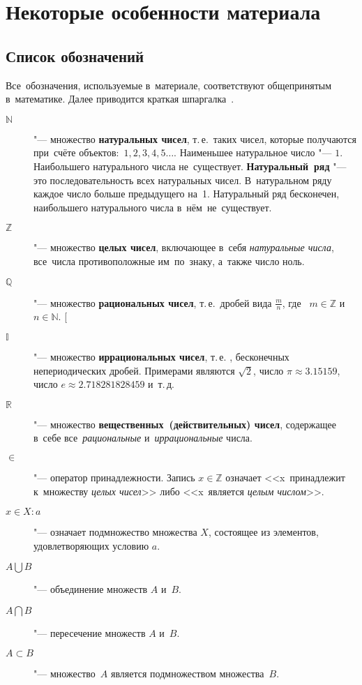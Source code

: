 \documentclass[]{scrartcl}
\begin{document}
\tableofcontents
\section{Некоторые особенности материала}
\subsection{Список обозначений}\label{mathan-gloss-symbols}
Все~обозначения, используемые в~материале, соответствуют общепринятым в~математике. Далее приводится краткая шпаргалка~\cite{CSC:intro-in-matan}.
\begin{description}
	\item[$\mathbb{N}$] "--- множество \textbf{натуральных чисел}, т.\,е.~таких чисел, которые получаются при~счёте объектов:~$1, 2, 3, 4, 5\ldots$. Наименьшее натуральное число "--- $1$. Наибольшего натурального числа не~существует. \textbf{Натуральный~ряд} "--- это последовательность всех натуральных чисел. В~натуральном ряду каждое число больше предыдущего на~1. Натуральный ряд бесконечен, наибольшего натурального числа в~нём~не~существует.
	\item[$\mathbb{Z}$] "--- множество \textbf{целых чисел}, включающее в~себя \emph{натуральные числа}, все~числа противоположные им~по~знаку, а~также число ноль.
	\item[$\mathbb{Q}$] "--- множество \textbf{рациональных чисел}, т.\,е.~дробей вида $\frac{m}{n}$, где~ $m \in \mathbb{Z}$ и~$n \in \mathbb{N}$.
	[\item[$\mathbb{I}$] "--- множество \textbf{иррациональных чисел}, т.\,е. , бесконечных непериодических дробей. Примерами являются $\sqrt{2}$, число $\pi \approx 3.15159$, число $e \approx 2.718281828459$ и~т.\,д.
	\item[$\mathbb{R}$] "--- множество \textbf{вещественных~(действительных) чисел}, содержащее в~себе все~\emph{рациональные} и~\emph{иррациональные} числа.
	\item[$\in$] "--- оператор принадлежности. Запись $x \in \mathbb{Z}$ означает <<x~принадлежит к~множеству \emph{целых чисел}>> либо <<x~является \emph{целым числом}>>.
	\item[$x\in X:a$] "--- означает подмножество множества $X$, состоящее из элементов, удовлетворяющих условию $a$.
	\item[${A\bigcup B}$] "--- объединение множеств $A$ и~$B$.
	\item[${A\bigcap B}$] "--- пересечение множеств $A$ и~$B$.
	\item[${A\subset B}$] "--- множество~$A$ является подмножеством множества~$B$.

\end{description}
\end{document}
